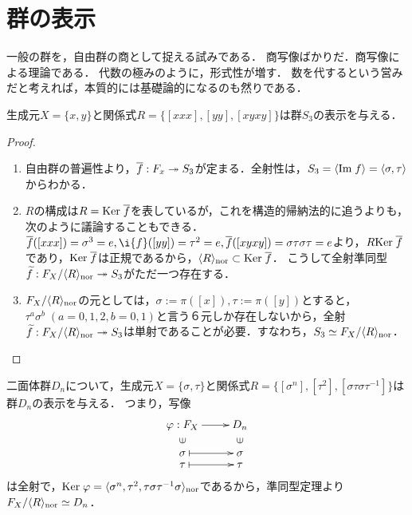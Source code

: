 \documentclass[uplatex,dvipdfmx]{jsreport}
\begin{document}
\section{群の表示}

\begin{tcolorbox}[colframe=ForestGreen, colback=ForestGreen!10!white,breakable,colbacktitle=ForestGreen!40!white,coltitle=black,fonttitle=\bfseries\sffamily,
title=generators and relations]
    一般の群を，自由群の商として捉える試みである．
    商写像ばかりだ．商写像による理論である．
    代数の極みのように，形式性が増す．
    数を代するという営みだと考えれば，本質的には基礎論的になるのも然りである．
\end{tcolorbox}

\begin{example}[$S_3$の表示]\label{exp-presentation-of-S3}
    生成元$X=\{x,y\}$と関係式$R=\{[xxx],[yy],[xyxy]\}$は群$S_3$の表示を与える．
    \begin{proof}\mbox{}
        \begin{enumerate}
            \item 自由群の普遍性より，$\overline{f}:F_x\twoheadrightarrow S_3$が定まる．全射性は，$S_3=\langle\mathrm{Im}\; f\rangle=\langle\sigma,\tau\rangle$からわかる．
            \item $R$の構成は$R=\mathrm{Ker}\;\overline{f}$を表しているが，これを構造的帰納法的に追うよりも，次のように議論することもできる．$\o{f}([xxx])=\sigma^3=e,\i{f}([yy])=\tau^2=e,\o{f}([xyxy])=\sigma\tau\sigma\tau=e$より，$R\mathrm{Ker}\;\overline{f}$であり，$\mathrm{Ker}\;\overline{f}$は正規であるから，$\langle R\rangle_{\mathrm{nor}}\subset\mathrm{Ker}\;\overline{f}$．
            こうして全射準同型$\widetilde{f}:F_X/\langle R\rangle_{\mathrm{nor}}\twoheadrightarrow S_3$がただ一つ存在する．
            \item $F_X/\langle R\rangle_{\mathrm{nor}}$の元としては，$\sigma:=\pi([x]),\tau:=\pi([y])$とすると，$\tau^a\sigma^b\;(a=0,1,2,b=0,1)$と言う６元しか存在しないから，全射$\widetilde{f}:F_X/\langle R\rangle_{\mathrm{nor}}\twoheadrightarrow S_3$は単射であることが必要．すなわち，$S_3\simeq F_X/\langle R\rangle_{\mathrm{nor}}$．
        \end{enumerate}
    \end{proof}
\end{example}

\begin{example}[$D_n$の表示]
    二面体群$D_n$について，生成元$X=\{\sigma,\tau\}$と関係式$R=\{[\sigma^n],[\tau^2],[\sigma\tau\sigma\tau^{-1}]\}$は群$D_n$の表示を与える．
    つまり，写像
    \[\xymatrix@R-2pc{
        \varphi:F_X\ar[r]&D_n\\
        \rotatebox[origin=c]{90}{$\in$}&\rotatebox[origin=c]{90}{$\in$}\\
        \sigma\ar@{|->}[r]&\sigma\\
        \tau\ar@{|->}[r]&\tau
    }\]
    は全射で，$\mathrm{Ker}\;\varphi=\langle\sigma^n,\tau^2,\tau\sigma\tau^{-1}\sigma\rangle_{\mathrm{nor}}$であるから，準同型定理より$F_X/\langle R\rangle_{\mathrm{nor}}\simeq D_n$．
\end{example}
\end{document}
